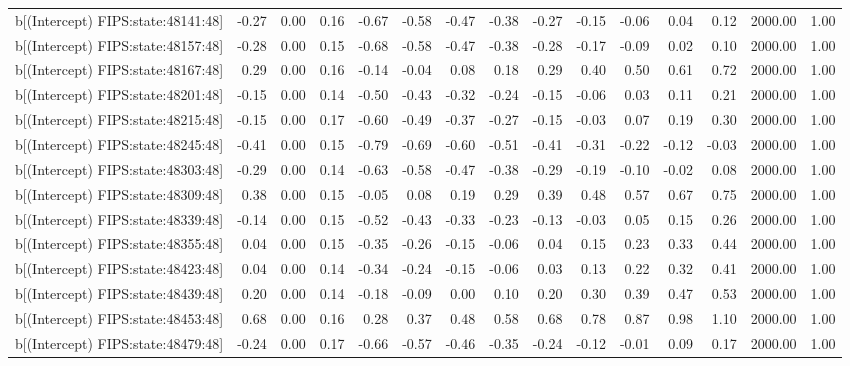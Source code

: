 \begin{table}[ht]
\begin{tabular}{rrrrrrrrrrrrrrr}
  b[(Intercept) FIPS:state:48141:48] & -0.27 & 0.00 & 0.16 & -0.67 & -0.58 & -0.47 & -0.38 & -0.27 & -0.15 & -0.06 & 0.04 & 0.12 & 2000.00 & 1.00 \\ 
  b[(Intercept) FIPS:state:48157:48] & -0.28 & 0.00 & 0.15 & -0.68 & -0.58 & -0.47 & -0.38 & -0.28 & -0.17 & -0.09 & 0.02 & 0.10 & 2000.00 & 1.00 \\ 
  b[(Intercept) FIPS:state:48167:48] & 0.29 & 0.00 & 0.16 & -0.14 & -0.04 & 0.08 & 0.18 & 0.29 & 0.40 & 0.50 & 0.61 & 0.72 & 2000.00 & 1.00 \\ 
  b[(Intercept) FIPS:state:48201:48] & -0.15 & 0.00 & 0.14 & -0.50 & -0.43 & -0.32 & -0.24 & -0.15 & -0.06 & 0.03 & 0.11 & 0.21 & 2000.00 & 1.00 \\ 
  b[(Intercept) FIPS:state:48215:48] & -0.15 & 0.00 & 0.17 & -0.60 & -0.49 & -0.37 & -0.27 & -0.15 & -0.03 & 0.07 & 0.19 & 0.30 & 2000.00 & 1.00 \\ 
  b[(Intercept) FIPS:state:48245:48] & -0.41 & 0.00 & 0.15 & -0.79 & -0.69 & -0.60 & -0.51 & -0.41 & -0.31 & -0.22 & -0.12 & -0.03 & 2000.00 & 1.00 \\ 
  b[(Intercept) FIPS:state:48303:48] & -0.29 & 0.00 & 0.14 & -0.63 & -0.58 & -0.47 & -0.38 & -0.29 & -0.19 & -0.10 & -0.02 & 0.08 & 2000.00 & 1.00 \\ 
  b[(Intercept) FIPS:state:48309:48] & 0.38 & 0.00 & 0.15 & -0.05 & 0.08 & 0.19 & 0.29 & 0.39 & 0.48 & 0.57 & 0.67 & 0.75 & 2000.00 & 1.00 \\ 
  b[(Intercept) FIPS:state:48339:48] & -0.14 & 0.00 & 0.15 & -0.52 & -0.43 & -0.33 & -0.23 & -0.13 & -0.03 & 0.05 & 0.15 & 0.26 & 2000.00 & 1.00 \\ 
  b[(Intercept) FIPS:state:48355:48] & 0.04 & 0.00 & 0.15 & -0.35 & -0.26 & -0.15 & -0.06 & 0.04 & 0.15 & 0.23 & 0.33 & 0.44 & 2000.00 & 1.00 \\ 
  b[(Intercept) FIPS:state:48423:48] & 0.04 & 0.00 & 0.14 & -0.34 & -0.24 & -0.15 & -0.06 & 0.03 & 0.13 & 0.22 & 0.32 & 0.41 & 2000.00 & 1.00 \\ 
  b[(Intercept) FIPS:state:48439:48] & 0.20 & 0.00 & 0.14 & -0.18 & -0.09 & 0.00 & 0.10 & 0.20 & 0.30 & 0.39 & 0.47 & 0.53 & 2000.00 & 1.00 \\ 
  b[(Intercept) FIPS:state:48453:48] & 0.68 & 0.00 & 0.16 & 0.28 & 0.37 & 0.48 & 0.58 & 0.68 & 0.78 & 0.87 & 0.98 & 1.10 & 2000.00 & 1.00 \\ 
  b[(Intercept) FIPS:state:48479:48] & -0.24 & 0.00 & 0.17 & -0.66 & -0.57 & -0.46 & -0.35 & -0.24 & -0.12 & -0.01 & 0.09 & 0.17 & 2000.00 & 1.00 \\ 

\end{tabular}
\end{table}
